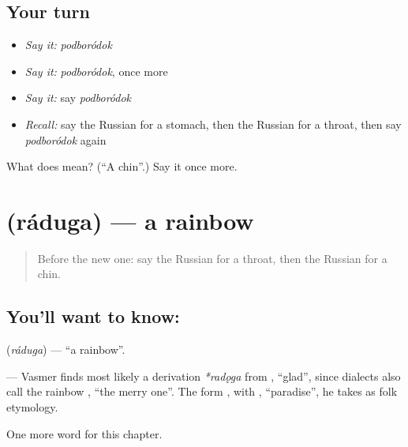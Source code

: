 \subsection*{Your turn}
\begin{itemize}
\raggedright
  \item \emph{Say it:} \emph{podboródok}
  \item \emph{Say it:} \emph{podboródok}, once more
  \item \emph{Say it:} say \emph{podboródok}
  \item \emph{Recall:} say the Russian for a stomach, then the Russian for a throat, then say \emph{podboródok} again
\end{itemize}

\begin{tcolorbox}[breakable,colback=teal!4,colframe=teal!35!black,title={Before you move on}]
What does  mean? (\textquotedblleft{}A chin\textquotedblright{}.) Say it once more.
\end{tcolorbox}
\section[\texorpdfstring{\ru{радуга} (ráduga)}{радуга (ráduga)}]{ (ráduga) — a rainbow}

\label{lesson:RU-C122-rainbow}



\begin{quote}
Before the new one: say the Russian for a throat, then the Russian for a chin.
\end{quote}

\subsection*{You'll want to know: }
\textbf{} (\emph{ráduga}) — \textquotedblleft{}a rainbow\textquotedblright{}.

\begin{cousinweb}
\textbf{} — Vasmer finds most likely a derivation \emph{*radǫga} from \emph{}, \textquotedblleft{}glad\textquotedblright{}, since dialects also call the rainbow \emph{}, \textquotedblleft{}the merry one\textquotedblright{}. The form \emph{}, with \emph{}, \textquotedblleft{}paradise\textquotedblright{}, he takes as folk etymology.
\end{cousinweb}

\begin{grammarlens}[title={What you've built}]
One more word for this chapter.
\end{grammarlens}

